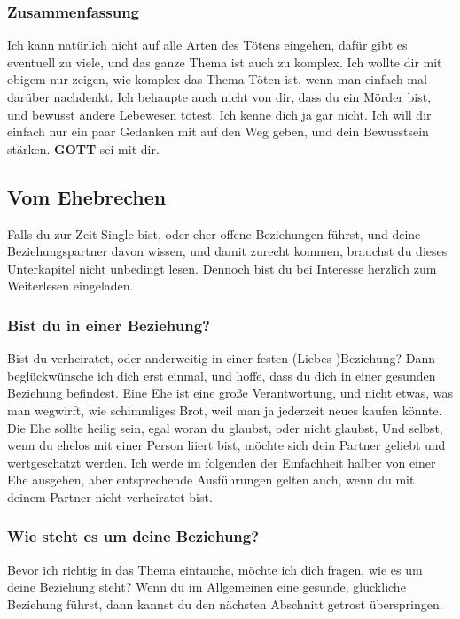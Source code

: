 \documentclass[10pt,a5paper]{article}
\newcommand{\Gott}[0]{\textbf{GOTT}}
\begin{document}
	\subsubsection{Zusammenfassung}
		Ich kann nat\"urlich nicht auf alle Arten des T\"otens eingehen,
		daf\"ur gibt es eventuell zu viele,
		und das ganze Thema ist auch zu komplex.
		Ich wollte dir mit obigem nur zeigen,
		wie komplex das Thema T\"oten ist,
		wenn man einfach mal dar\"uber nachdenkt.
		Ich behaupte auch nicht von dir,
		dass du ein M\"order bist,
		und bewusst andere Lebewesen t\"otest.
		Ich kenne dich ja gar nicht.
		Ich will dir einfach nur ein paar Gedanken mit auf den Weg geben,
		und dein Bewusstsein st\"arken.
		{\Gott} sei mit dir.
	
	\subsection{Vom Ehebrechen}
		Falls du zur Zeit Single bist,
		oder eher offene Beziehungen f\"uhrst,
		und deine Beziehungspartner davon wissen,
		und damit zurecht kommen,
		brauchst du dieses Unterkapitel nicht unbedingt lesen.
		Dennoch bist du bei Interesse herzlich zum Weiterlesen eingeladen.

	\subsubsection{Bist du in einer Beziehung?}
		Bist du verheiratet,
		oder anderweitig in einer festen (Liebes-)Beziehung?
		Dann begl\"uckw\"unsche ich dich erst einmal,
		und hoffe,
		dass du dich in einer gesunden Beziehung befindest.
		Eine Ehe ist eine gro{\ss}e Verantwortung,
		und nicht etwas,
		was man wegwirft,
		wie schimmliges Brot,
		weil man ja jederzeit neues kaufen k\"onnte.
		Die Ehe sollte heilig sein,
		egal woran du glaubst,
		oder nicht glaubst,
		Und selbst,
		wenn du ehelos mit einer Person liiert bist,
		m\"ochte sich dein Partner geliebt und wertgesch\"atzt werden.
		Ich werde im folgenden der Einfachheit halber von einer Ehe ausgehen,
		aber entsprechende Ausf\"uhrungen gelten auch,
		wenn du mit deinem Partner nicht verheiratet bist.

	\subsubsection{Wie steht es um deine Beziehung?}
		Bevor ich richtig in das Thema eintauche,
		m\"ochte ich dich fragen,
		wie es um deine Beziehung steht?
		Wenn du im Allgemeinen eine gesunde,
		gl\"uckliche Beziehung f\"uhrst,
		dann kannst du den n\"achsten Abschnitt getrost \"uberspringen.
\end{document}

